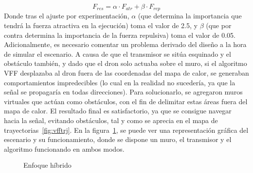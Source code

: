 \begin{equation}
    F_{res} = \alpha \cdot F_{atr} + \beta \cdot F_{rep}
    \label{eq:vff}
\end{equation}
Donde tras el ajuste por experimentación, $\alpha$ (que determina la importancia que tendrá la fuerza atractiva en la ejecución) toma el valor de 2.5, y $\beta$ (que por contra determina la importancia de la fuerza repulsiva) toma el valor de 0.05. Adicionalmente, es necesario comentar un problema derivado del diseño a la hora de simular el escenario. A causa de que el transmisor se sitúa esquinado y el obstáculo también, y dado que el dron solo actuaba sobre el muro, si el algoritmo \ac{VFF} desplazaba al dron fuera de las coordenadas del mapa de calor, se generaban comportamientos impredecibles (lo cual en la realidad no sucedería, ya que la señal se propagaría en todas direcciones). Para solucionarlo, se agregaron muros virtuales que actúan como obstáculos, con el fin de delimitar estas áreas fuera del mapa de calor. El resultado final es satisfactorio, ya que se consigue navegar hacia la señal, evitando obstáculos, tal y como se aprecia en el mapa de trayectorias~\ref{fig:vfftrj}. En la figura~\ref{fig:hybrid}, se puede ver una representación gráfica del escenario y su funcionamiento, donde se dispone un muro, el transmisor y el algoritmo funcionando en ambos modos.
\begin{figure} [hp]
	\centering
	\quad
	\caption{Enfoque híbrido}
	\label{fig:hybrid}
\end{figure}